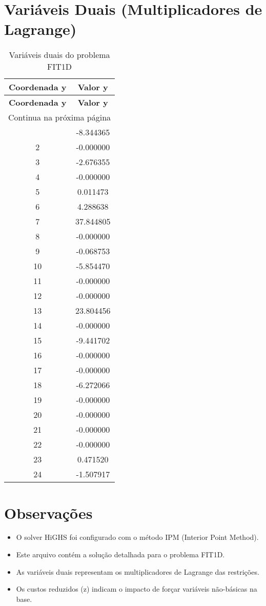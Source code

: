 \documentclass[12pt]{article}
\begin{document}
\section{Variáveis Duais (Multiplicadores de Lagrange)}

\begin{longtable}{@{}cc@{}}
\caption{Variáveis duais do problema FIT1D} \\
\toprule
\textbf{Coordenada y} & \textbf{Valor y} \\
\midrule
\endfirsthead

\toprule
\textbf{Coordenada y} & \textbf{Valor y} \\
\midrule
\endhead

\midrule \multicolumn{2}{r}{{Continua na próxima página}} \\ \midrule
\endfoot

\bottomrule
\endlastfoot
1 & -8.344365 \\
2 & -0.000000 \\
3 & -2.676355 \\
4 & -0.000000 \\
5 & 0.011473 \\
6 & 4.288638 \\
7 & 37.844805 \\
8 & -0.000000 \\
9 & -0.068753 \\
10 & -5.854470 \\
11 & -0.000000 \\
12 & -0.000000 \\
13 & 23.804456 \\
14 & -0.000000 \\
15 & -9.441702 \\
16 & -0.000000 \\
17 & -0.000000 \\
18 & -6.272066 \\
19 & -0.000000 \\
20 & -0.000000 \\
21 & -0.000000 \\
22 & -0.000000 \\
23 & 0.471520 \\
24 & -1.507917 \\

\end{longtable}


\section{Observações}

\begin{itemize}
\item O solver HiGHS foi configurado com o método IPM (Interior Point Method).
\item Este arquivo contém a solução detalhada para o problema FIT1D.
\item As variáveis duais representam os multiplicadores de Lagrange das restrições.
\item Os custos reduzidos (z) indicam o impacto de forçar variáveis não-básicas na base.
\end{itemize}
\end{document}
